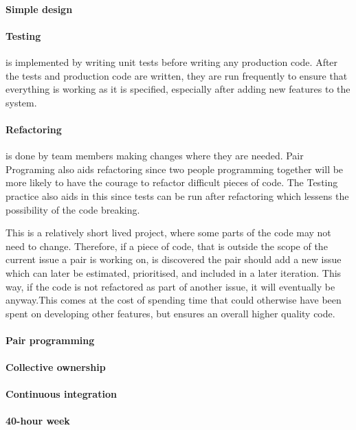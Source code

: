 \paragraph{Simple design}

\paragraph{Testing} is implemented by writing unit tests before writing any production code. After the tests and production code are written, they are run frequently to ensure that everything is working as it is specified, especially after adding new features to the system.

\paragraph{Refactoring} is done by team members making changes where they are needed. Pair Programing also aids refactoring since two people programming together will be more likely to have the courage to refactor difficult pieces of code. The Testing practice also aids in this since tests can be run after refactoring which lessens the possibility of the code breaking.

This is a relatively short lived project, where some parts of the code may not need to change. Therefore, if a piece of code, that is outside the scope of the current issue a pair is working on, is discovered the pair should add a new issue which can later be estimated, prioritised, and included in a later iteration. This way, if the code is not refactored as part of another issue, it will eventually be anyway.This comes at the cost of spending time that could otherwise have been spent on developing other features, but ensures an overall higher quality code. 

\paragraph{Pair programming}

\paragraph{Collective ownership}

\paragraph{Continuous integration}

\paragraph{40-hour week}
 
